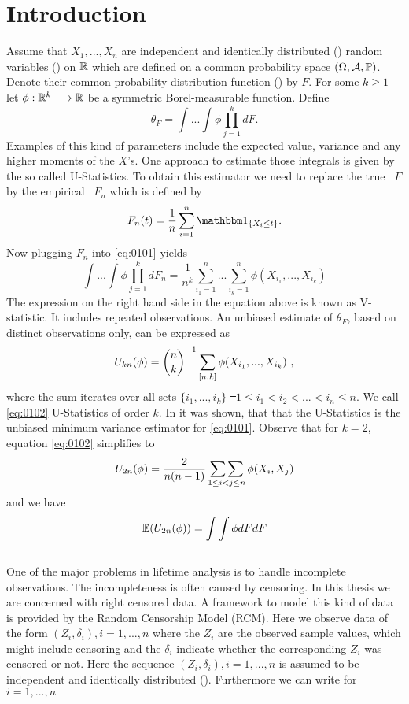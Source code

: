 \chapter{Introduction} \label{ch:introduction}
\label{sec:introduction}

Assume that $X_1,...,X_n$ are independent and identically distributed (\iid) random variables (\rv) on $\mathbb{R}$ which are defined on a common probability space $(\Omega, \mathcal{A}, \mathbb{P})$. Denote their common probability distribution function (\df) by $F$. For some $k\geq 1$ let $\phi: \mathbb{R}^k \longrightarrow \mathbb{R}$ be a symmetric Borel-measurable function. Define
\begin{equation}
\theta_F = \int ... \int \phi \prod\limits_{j=1}^k dF. 
\label{eq:0101}
\end{equation}
Examples of this kind of parameters include the expected value, variance and any higher moments of the $X$'s. One approach to estimate those integrals is given by the so called U-Statistics. To obtain this estimator we need to replace the true \df\ $F$ by the empirical \df\ $F_n$ which is defined by
$$F_n(t) = \frac{1}{n}\sum\limits_{i=1}^n \I{X_i\leq t}.$$
Now plugging $F_n$ into \eqref{eq:0101} yields
$$\int ... \int \phi \prod\limits_{j=1}^k dF_n = \frac{1}{n^k}\sum\limits_{i_1=1}^n...\sum\limits_{i_k=1}^n \phi(X_{i_1},...,X_{i_k})$$
The expression on the right hand side in the equation above is known as V-statistic. It includes repeated observations. An unbiased estimate of $\theta_F$, based on distinct observations only, can be expressed as
\begin{equation}
U_{kn}(\phi) = {n \choose k}^{-1} \sum\limits_{[n,k]} \phi(X_{i_1},...,X_{i_k})\textrm{ ,}
\label{eq:0102}
\end{equation}
where the sum iterates over all sets $\{i_1,...,i_k\}$ \st\ $ 1\leq i_1 < i_2 < ... < i_n \leq n$. We call \eqref{eq:0102} U-Statistics of order $k$. In \cite{lee1990u} it was shown, that that the U-Statistics is the unbiased minimum variance estimator for \eqref{eq:0101}. Observe that for $k=2$, equation \eqref{eq:0102} simplifies to
$$U_{2n}(\phi)=\frac{2}{n(n-1)}\mathop{\sum\sum}\limits_{1\leq i<j \leq n}\phi(X_i,X_j)$$
and we have
$$\mathbb{E}(U_{2n}(\phi))=\int \int \phi dF dF$$
\\
One of the major problems in lifetime analysis is to handle incomplete observations. The incompleteness is often caused by censoring. In this thesis we are concerned with right censored data. A framework to model this kind of data is provided by the Random Censorship Model (RCM). Here we observe data of the form $(Z_i, \delta_i), i=1,...,n$ where the $Z_i$ are the observed sample values, which might include censoring and the $\delta_i$ indicate whether the corresponding $Z_i$ was censored or not. Here the sequence $(Z_i, \delta_i), i=1,...,n$ is assumed to be independent and identically distributed (\iid). Furthermore we can write for $i=1,...,n$
